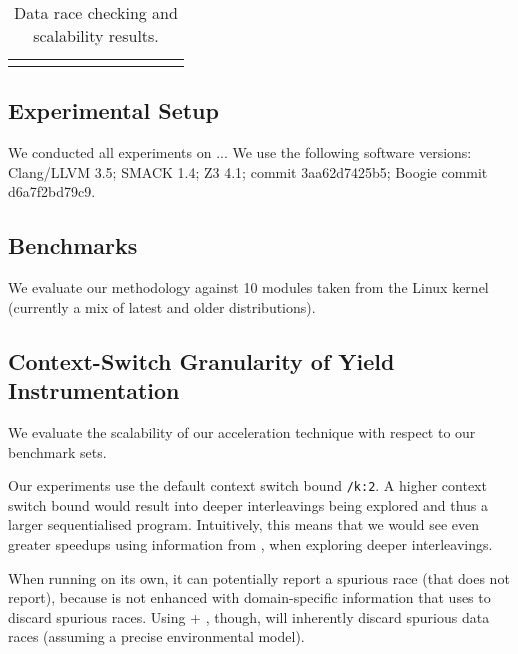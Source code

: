 \newcommand{\colspacing}{\hspace{1.8em}}
\begin{table*}[t]
\small
\centering
\begin{tabular}{l rrr rrr rr r r}
\centering

\end{tabular}
\caption{Data race checking and scalability results.}
\label{tab:races}
\end{table*}

\subsection{Experimental Setup}
\label{eval:setup}

We conducted all experiments on ... We use the following software versions: Clang/LLVM 3.5; SMACK 1.4; Z3 4.1; \corral commit 3aa62d7425b5; Boogie commit d6a7f2bd79c9.

\subsection{Benchmarks}
\label{eval:benchmarks}

We evaluate our methodology against 10 modules taken from the Linux kernel (currently a mix of latest and older distributions). 

\subsection{Context-Switch Granularity of Yield Instrumentation}
\label{eval:granularity}

We evaluate the scalability of our acceleration technique with respect to our benchmark sets.

Our experiments use the default \corral context switch bound \texttt{/k:2}. A higher context switch bound would result into deeper interleavings being explored and thus a larger sequentialised program. Intuitively, this means that we would see even greater speedups using information from \whoop, when exploring deeper interleavings. 

When running \corral on its own, it can potentially report a spurious race (that \whoop does not report), because \corral is not enhanced with domain-specific information that \whoop uses to discard spurious races. Using \whoop + \corral, though, will inherently discard spurious data races (assuming a precise environmental model).

